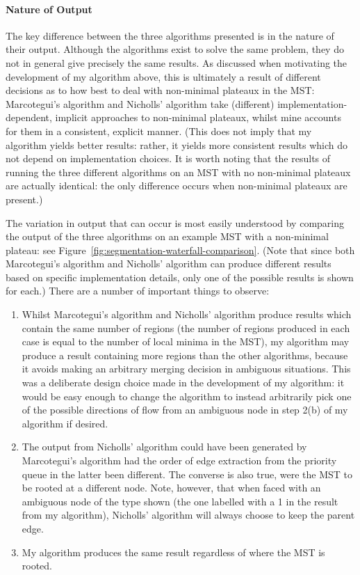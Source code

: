 \paragraph{Nature of Output}

The key difference between the three algorithms presented is in the nature of their output. Although the algorithms exist to solve the same problem, they do not in general give precisely the same results. As discussed when motivating the development of my algorithm above, this is ultimately a result of different decisions as to how best to deal with non-minimal plateaux in the MST: Marcotegui's algorithm and Nicholls' algorithm take (different) implementation-dependent, implicit approaches to non-minimal plateaux, whilst mine accounts for them in a consistent, explicit manner. (This does not imply that my algorithm yields better results: rather, it yields more consistent results which do not depend on implementation choices. It is worth noting that the results of running the three different algorithms on an MST with no non-minimal plateaux are actually identical: the only difference occurs when non-minimal plateaux are present.)

The variation in output that can occur is most easily understood by comparing the output of the three algorithms on an example MST with a non-minimal plateau: see Figure~\ref{fig:segmentation-waterfall-comparison}. (Note that since both Marcotegui's algorithm and Nicholls' algorithm can produce different results based on specific implementation details, only one of the possible results is shown for each.) There are a number of important things to observe:
%
\begin{enumerate}

\item Whilst Marcotegui's algorithm and Nicholls' algorithm produce results which contain the same number of regions (the number of regions produced in each case is equal to the number of local minima in the MST), my algorithm may produce a result containing more regions than the other algorithms, because it avoids making an arbitrary merging decision in ambiguous situations. This was a deliberate design choice made in the development of my algorithm: it would be easy enough to change the algorithm to instead arbitrarily pick one of the possible directions of flow from an ambiguous node in step 2(b) of my algorithm if desired.

\item The output from Nicholls' algorithm could have been generated by Marcotegui's algorithm had the order of edge extraction from the priority queue in the latter been different. The converse is also true, were the MST to be rooted at a different node. Note, however, that when faced with an ambiguous node of the type shown (the one labelled with a 1 in the result from my algorithm), Nicholls' algorithm will always choose to keep the parent edge.

\item My algorithm produces the same result regardless of where the MST is rooted.

\end{enumerate}
%

